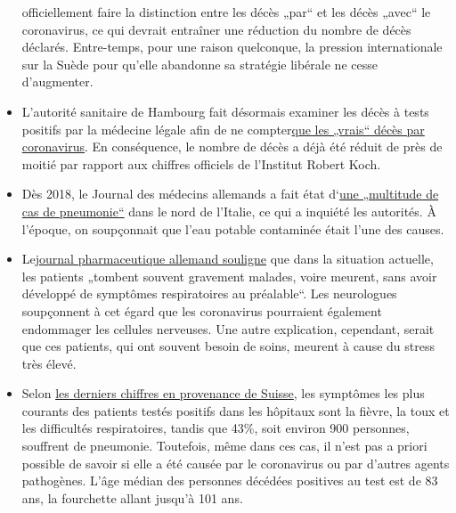 \begin{itemize}
  officiellement faire la distinction entre les décès „par`` et les
  décès „avec`` le coronavirus, ce qui devrait entraîner une réduction
  du nombre de décès déclarés. Entre-temps, pour une raison quelconque,
  la pression internationale sur la Suède pour qu'elle abandonne sa
  stratégie libérale ne cesse d'augmenter.
\item
  L'autorité sanitaire de Hambourg fait désormais examiner les décès à
  tests positifs par la médecine légale afin de ne
  compter\href{https://www.t-online.de/nachrichten/deutschland/id_87636856/coronavirus-hamburg-will-nur-echte-covid-19-tote-zaehlen.html}{que
  les „vrais`` décès par coronavirus}. En conséquence, le nombre de
  décès a déjà été réduit de près de moitié par rapport aux chiffres
  officiels de l'Institut Robert Koch.
\item
  Dès 2018, le Journal des médecins allemands a fait état
  d`\href{https://www.aerzteblatt.de/nachrichten/97750/Vielzahl-an-Lungenentzuendungen-beunruhigen-Behoerden-in-Norditalien}{une
  „multitude de cas de pneumonie``} dans le nord de l'Italie, ce qui a
  inquiété les autorités. À l'époque, on soupçonnait que l'eau potable
  contaminée était l'une des causes.
\item
  Le\href{https://www.pharmazeutische-zeitung.de/atemstillstand-koennte-auch-zentrale-ursache-haben-116664/}{journal
  pharmaceutique allemand souligne} que dans la situation actuelle, les
  patients „tombent souvent gravement malades, voire meurent, sans avoir
  développé de symptômes respiratoires au préalable``. Les neurologues
  soupçonnent à cet égard que les coronavirus pourraient également
  endommager les cellules nerveuses. Une autre explication, cependant,
  serait que ces patients, qui ont souvent besoin de soins, meurent à
  cause du stress très élevé.
\item
  Selon
  \href{https://www.bag.admin.ch/dam/bag/de/dokumente/mt/k-und-i/aktuelle-ausbrueche-pandemien/2019-nCoV/covid-19-lagebericht.pdf.download.pdf/COVID-19_Epidemiologische_Lage_Schweiz.pdf}{les
  derniers chiffres en provenance de Suisse}, les symptômes les plus
  courants des patients testés positifs dans les hôpitaux sont la
  fièvre, la toux et les difficultés respiratoires, tandis que 43\%,
  soit environ 900 personnes, souffrent de pneumonie. Toutefois, même
  dans ces cas, il n'est pas a priori possible de savoir si elle a été
  causée par le coronavirus ou par d'autres agents pathogènes. L'âge
  médian des personnes décédées positives au test est de 83 ans, la
  fourchette allant jusqu'à 101 ans.

\end{itemize}
